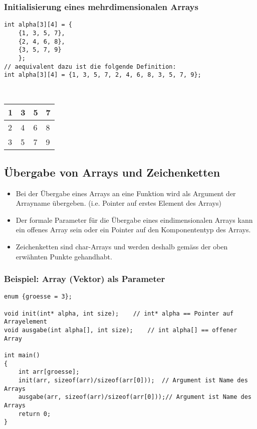 \subsubsection{Initialisierung eines mehrdimensionalen Arrays\hfill}
\label{sec:unterunterabschnitt}
\noindent
\begin{minipage}{\linewidth}
\begin{lstlisting}
int alpha[3][4] = {
	{1, 3, 5, 7},
	{2, 4, 6, 8},
	{3, 5, 7, 9}
	};
// aequivalent dazu ist die folgende Definition:
int alpha[3][4] = {1, 3, 5, 7, 2, 4, 6, 8, 3, 5, 7, 9};
\end{lstlisting}
\end{minipage}
\\
\centering
\begin{tabularx}{0.25\textwidth}{|X|X|X|X|}
	\hline
	1 & 3 & 5 & 7\\
	\hline
	2 & 4 & 6 & 8\\
	\hline
	3 & 5 & 7 & 9\\
	\hline
\end{tabularx}
\flushleft


\subsection{Übergabe von Arrays und Zeichenketten\hfill}
\label{sec:unterabschnitt}
\begin{itemize}
	\item Bei der Übergabe eines Arrays an eine Funktion wird als Argument der Arrayname übergeben. (i.e. Pointer auf erstes Element des Arrays)
	\item Der formale Parameter für die Übergabe eines eindimensionalen Arrays kann ein offenes Array sein oder ein Pointer auf den Komponententyp des Arrays.
	\item Zeichenketten sind char-Arrays und werden deshalb gemäss der oben erwähnten Punkte gehandhabt.
\end{itemize}

\subsubsection{Beispiel: Array (Vektor) als Parameter\hfill}
\label{sec:unterunterabschnitt}
\noindent
\begin{minipage}{\linewidth}
\begin{lstlisting}
enum {groesse = 3};

void init(int* alpha, int size);	// int* alpha == Pointer auf Arrayelement
void ausgabe(int alpha[], int size);	// int alpha[] == offener Array

int main()
{
	int arr[groesse];
	init(arr, sizeof(arr)/sizeof(arr[0]));	// Argument ist Name des Arrays
	ausgabe(arr, sizeof(arr)/sizeof(arr[0]));// Argument ist Name des Arrays
	return 0;
}
\end{lstlisting}
\end{minipage}

